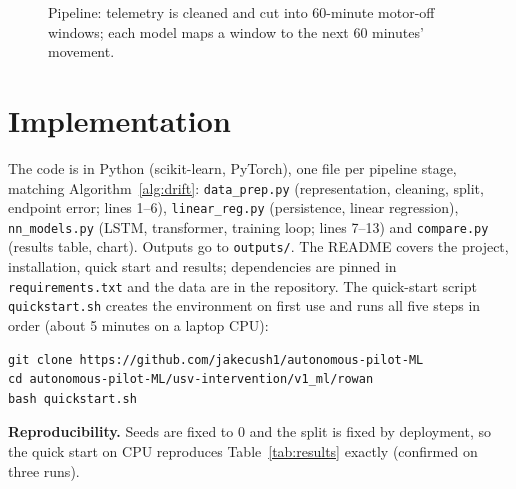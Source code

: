 \documentclass[sigconf]{acmart}
\begin{document}
\begin{figure}[t]
\centering
{}
\caption{Pipeline: telemetry is cleaned and cut into 60-minute motor-off windows; each model maps a window to the next 60 minutes' movement.}
\label{fig:pipeline}
\end{figure}

\section{Implementation}\label{sec:impl}
The code is in Python (scikit-learn, PyTorch), one file per pipeline stage, matching Algorithm~\ref{alg:drift}: \texttt{data\_prep.py} (representation, cleaning, split, endpoint error; lines 1--6), \texttt{linear\_reg.py} (persistence, linear regression), \texttt{nn\_models.py} (LSTM, transformer, training loop; lines 7--13) and \texttt{compare.py} (results table, chart). Outputs go to \texttt{outputs/}. The README covers the project, installation, quick start and results; dependencies are pinned in \texttt{requirements.txt} and the data are in the repository. The quick-start script \texttt{quickstart.sh} creates the environment on first use and runs all five steps in order (about 5 minutes on a laptop CPU):
{\footnotesize
\begin{verbatim}
git clone https://github.com/jakecush1/autonomous-pilot-ML
cd autonomous-pilot-ML/usv-intervention/v1_ml/rowan
bash quickstart.sh
\end{verbatim}}
\textbf{Reproducibility.} Seeds are fixed to 0 and the split is fixed by deployment, so the quick start on CPU reproduces Table~\ref{tab:results} exactly (confirmed on three runs).
\end{document}
